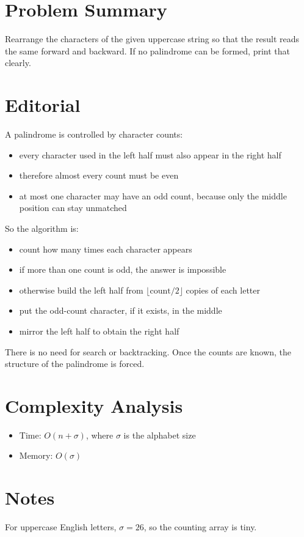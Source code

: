 \section{Problem Summary}
Rearrange the characters of the given uppercase string so that the result reads the same forward and backward. If no palindrome can be formed, print that clearly.

\section{Editorial}
A palindrome is controlled by character counts:
\begin{itemize}
\item every character used in the left half must also appear in the right half
\item therefore almost every count must be even
\item at most one character may have an odd count, because only the middle position can stay unmatched
\end{itemize}

So the algorithm is:
\begin{itemize}
\item count how many times each character appears
\item if more than one count is odd, the answer is impossible
\item otherwise build the left half from \(\lfloor \text{count} / 2 \rfloor\) copies of each letter
\item put the odd-count character, if it exists, in the middle
\item mirror the left half to obtain the right half
\end{itemize}

There is no need for search or backtracking. Once the counts are known, the structure of the palindrome is forced.

\section{Complexity Analysis}
\begin{itemize}
\item Time: \(O(n + \sigma)\), where \(\sigma\) is the alphabet size
\item Memory: \(O(\sigma)\)
\end{itemize}

\section{Notes}
For uppercase English letters, \(\sigma = 26\), so the counting array is tiny.
